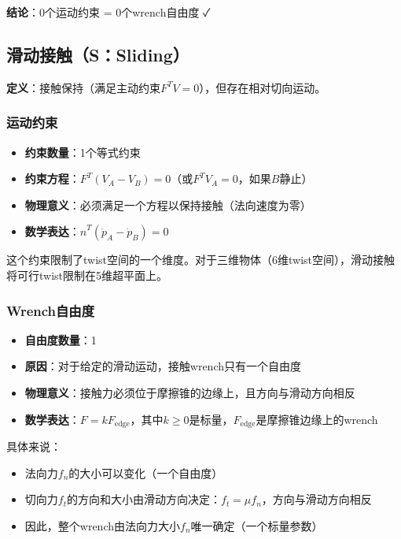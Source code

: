\documentclass[12pt,a4paper]{article}
\begin{document}
\textbf{结论}：$0$个运动约束 = $0$个wrench自由度 ✓

\subsection{滑动接触（S：Sliding）}

\textbf{定义}：接触保持（满足主动约束$F^T V = 0$），但存在相对切向运动。

\subsubsection{运动约束}

\begin{itemize}
    \item \textbf{约束数量}：1个等式约束
    \item \textbf{约束方程}：$F^T (V_A - V_B) = 0$（或$F^T V_A = 0$，如果$B$静止）
    \item \textbf{物理意义}：必须满足一个方程以保持接触（法向速度为零）
    \item \textbf{数学表达}：$\hat{n}^T (\dot{p}_A - \dot{p}_B) = 0$
\end{itemize}

这个约束限制了twist空间的一个维度。对于三维物体（6维twist空间），滑动接触将可行twist限制在5维超平面上。

\subsubsection{Wrench自由度}

\begin{itemize}
    \item \textbf{自由度数量}：1
    \item \textbf{原因}：对于给定的滑动运动，接触wrench只有一个自由度
    \item \textbf{物理意义}：接触力必须位于摩擦锥的边缘上，且方向与滑动方向相反
    \item \textbf{数学表达}：$F = k F_{\text{edge}}$，其中$k \geq 0$是标量，$F_{\text{edge}}$是摩擦锥边缘上的wrench
\end{itemize}

具体来说：
\begin{itemize}
    \item 法向力$f_n$的大小可以变化（一个自由度）
    \item 切向力$f_t$的方向和大小由滑动方向决定：$f_t = \mu f_n$，方向与滑动方向相反
    \item 因此，整个wrench由法向力大小$f_n$唯一确定（一个标量参数）
\end{itemize}
\end{document}
